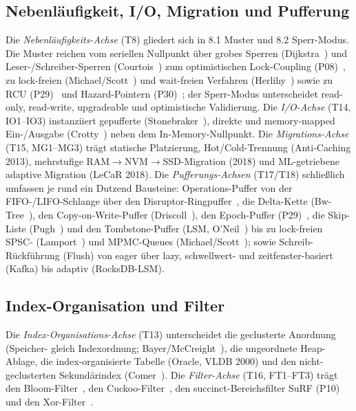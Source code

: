 \subsection{Nebenläufigkeit, I/O, Migration und Pufferung}\label{ssec:sota-ax-conc}
Die \emph{Nebenläufigkeits-Achse} (T8) gliedert sich in 8.1 Muster und 8.2 Sperr-Modus. Die Muster
reichen vom seriellen Nullpunkt über grobes Sperren (Dijkstra~\cite{dijkstra1965concurrent}) und
Leser-/Schreiber-Sperren (Courtois~\cite{courtois1971readers}) zum optimistischen Lock-Coupling
(P08)~\cite{leis2016olc}, zu lock-freien (Michael/Scott~\cite{michael1996queue}) und wait-freien
Verfahren (Herlihy~\cite{herlihy1991waitfree}) sowie zu RCU (P29)~\cite{mckenney2001rcu} und
Hazard-Pointern (P30)~\cite{michael2004hazard}; der Sperr-Modus unterscheidet read-only, read-write,
upgradeable und optimistische Validierung. Die \emph{I/O-Achse} (T14, IO1--IO3) instanziiert
gepufferte (Stonebraker~\cite{stonebraker1981os}), direkte und memory-mapped Ein-/Ausgabe
(Crotty~\cite{crotty2022mmap}) neben dem In-Memory-Nullpunkt. Die \emph{Migrations-Achse} (T15,
MG1--MG3) trägt statische Platzierung, Hot/Cold-Trennung (Anti-Caching 2013), mehrstufige
RAM$\to$NVM$\to$SSD-Migration (2018) und ML-getriebene adaptive Migration (LeCaR 2018). Die
\emph{Pufferungs-Achsen} (T17/T18) schließlich umfassen je rund ein Dutzend Bausteine:
Operations-Puffer von der FIFO-/LIFO-Schlange über den
Disruptor-Ringpuffer~\cite{thompson2011disruptor}, die Delta-Kette
(Bw-Tree~\cite{levandoski2013bwtree}), den Copy-on-Write-Puffer
(Driscoll~\cite{driscoll1989persistent}), den Epoch-Puffer (P29)~\cite{mckenney2001rcu}, die
Skip-Liste (Pugh~\cite{pugh1990skiplist}) und den Tombstone-Puffer (LSM, O'Neil~\cite{oneil1996lsm})
bis zu lock-freien SPSC- (Lamport~\cite{lamport_spsc}) und MPMC-Queues
(Michael/Scott~\cite{michael1996queue}); sowie Schreib-Rückführung (Flush) von eager über lazy,
schwellwert- und zeitfenster-basiert (Kafka) bis adaptiv (RocksDB-LSM).

\subsection{Index-Organisation und Filter}\label{ssec:sota-ax-idx}
Die \emph{Index-Organisations-Achse} (T13) unterscheidet die geclusterte Anordnung (Speicher- gleich
Indexordnung; Bayer/McCreight~\cite{bayer1972btree}), die ungeordnete Heap-Ablage, die
index-organisierte Tabelle (Oracle, VLDB 2000) und den nicht-geclusterten Sekundärindex
(Comer~\cite{comer1979btree}). Die \emph{Filter-Achse} (T16, FT1--FT3) trägt den
Bloom-Filter~\cite{bloom1970}, den Cuckoo-Filter~\cite{fan2014cuckoo}, den succinct-Bereichsfilter
SuRF (P10)~\cite{zhang2018surf} und den Xor-Filter~\cite{graf2020xor}.

